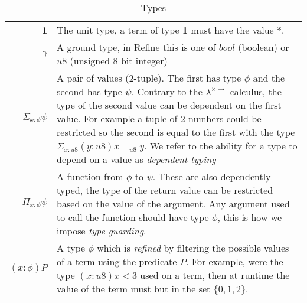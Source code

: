 \begin{table}
    \begin{tabular}{|r|p{}|}
        \hline
        \textbf{1} &
        The unit type, a term of type \textbf{1} must have the value $\ast$.\\\cline{1-2}
        $\gamma$ &
        A ground type, in Refine this is one of $bool$ (boolean) or $u8$ (unsigned 8 bit integer)\\\hline
        $\Sigma_{x:\phi} \psi$ &
        A pair of values (2-tuple).
        The first has type $\phi$ and the second has type $\psi$.
        Contrary to the $\lambda^{\times \rightarrow}$ calculus, the type of the second value
        can be dependent on the first value.
        For example a tuple of 2 numbers could be restricted so the second is equal to the
        first with the type
        $\Sigma_{x: u8} (y: u8) x =_{u8} y$.
        We refer to the ability for a type to depend on a value as \textit{dependent typing}\\\cline{1-2}
        $\Pi_{x:\phi} \psi$ &
        A function from $\phi$ to $\psi$.
        These are also dependently typed, the type of the return value can be restricted based on the
        value of the argument.
        Any argument used to call the function should have type $\phi$, this is how we impose
        \textit{type guarding}.\\\cline{1-2}
        $(x:\phi)P$ &
        A type $\phi$ which is \textit{refined} by filtering the possible values of a term using the
        predicate $P$.
        For example, were the type $(x: u8) x < 3$ used on a term, then at runtime the value of the
        term must but in the set $\{0, 1, 2\}$.\\\hline
    \end{tabular}
    \caption{Types}
    \label{tab:types}
\end{table}

